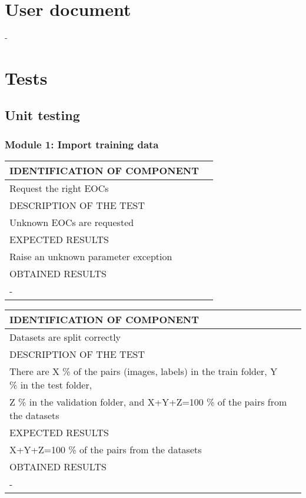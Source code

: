 \documentclass{polytech/polytech}
\numberwithin{figure}{chapter}
\begin{document}
\begin{appendix}
\chapter{User document}

-

\chapter{Tests}

\section{Unit testing}

\subsection{Module 1: Import training data}

\begin{table}[]
\begin{tabular}{|l|l|}\hline
\color{C} IDENTIFICATION OF COMPONENT \\\hline
Request the right EOCs  \\\hline
\color{C} DESCRIPTION OF THE TEST\\\hline
Unknown EOCs are requested \\\hline
\color{C} EXPECTED RESULTS \\\hline
Raise an unknown parameter exception \\\hline
\color{C} OBTAINED RESULTS \\\hline
- \\\hline
\end{tabular}
\end{table}

\begin{table}[]
\begin{tabular}{|l|l|}\hline
\color{C} IDENTIFICATION OF COMPONENT \\\hline
Datasets are split correctly  \\\hline
\color{C} DESCRIPTION OF THE TEST\\\hline
There are X \% of the pairs (images, labels) in the train folder, Y \% in the test folder,\\ Z \% in the validation folder, and X+Y+Z=100 \% of the pairs from the datasets \\\hline
\color{C} EXPECTED RESULTS \\\hline
X+Y+Z=100 \% of the pairs from the datasets \\\hline
\color{C} OBTAINED RESULTS \\\hline
- \\\hline
\end{tabular}
\end{table}


\end{appendix}
\end{document}

